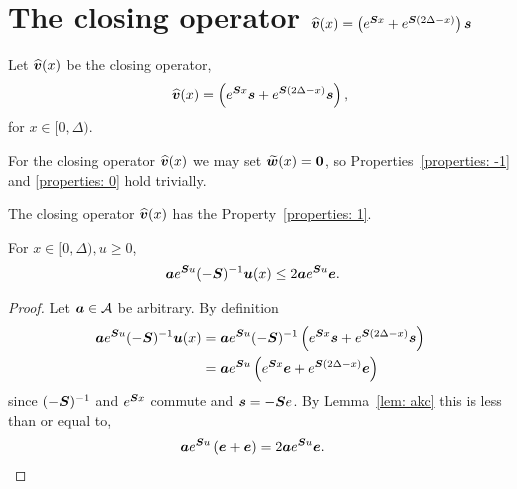 
\section{The closing operator \(\widehat{\boldsymbol v}(x) =  \left(e^{\boldsymbol{S} x}  + e^{\boldsymbol{S} (2\Delta-x)}  \right)\boldsymbol s\)}

Let \(\widehat{\boldsymbol v}(x)\) be the closing operator, 
\[  \widehat{\boldsymbol v}(x) =   \left(e^{\boldsymbol{S} x}\boldsymbol s  + e^{\boldsymbol{S} (2\Delta-x)}\boldsymbol s\right),\]
for \(x\in[0,\Delta)\).

For the closing operator \(\widehat{\boldsymbol v}(x)\) we may set \(\widetilde{\boldsymbol w}(x) = \boldsymbol 0\), so Properties~\ref{properties: -1} and \ref{properties: 0} hold trivially.

\begin{lem}\label{lem: akxnj}
	The closing operator \(\widehat{\boldsymbol v}(x)\) has the Property~\ref{properties: 1}.

	For \(x\in[0,\Delta),u\geq 0\),  
        \begin{align*}
        		\boldsymbol a   e^{\boldsymbol Su}(-\boldsymbol S)^{-1} {\boldsymbol u}(x) &\leq 2 \boldsymbol a e^{\boldsymbol Su} \boldsymbol e.
	\end{align*}
\end{lem}
\begin{proof}
Let \(\boldsymbol a   \in \mathcal A\) be arbitrary. By definition 
	\begin{align*}
        		\boldsymbol a  e^{\boldsymbol Su}(-\boldsymbol S)^{-1} {\boldsymbol u}(x) & = \boldsymbol a  e^{\boldsymbol Su}(-\boldsymbol S)^{-1}  \left(e^{\boldsymbol{S}x}\boldsymbol s + e^{\boldsymbol{S}(2\Delta-x)}\boldsymbol s\right)
				\\& = \boldsymbol a  e^{\boldsymbol Su}  \left(e^{\boldsymbol{S}x}\boldsymbol e + e^{\boldsymbol{S}(2\Delta-x)}\boldsymbol e\right)
	\end{align*}
	since \((-\boldsymbol S)^{-1}\) and \(e^{\boldsymbol Sx}\) commute and \(\boldsymbol s = -\boldsymbol S e\). 
	By Lemma~\ref{lem: akc} this is less than or equal to, 
	\begin{align}
        		& \boldsymbol a   e^{\boldsymbol Su} \left(\boldsymbol e + \boldsymbol e\right) = 2 \boldsymbol a   e^{\boldsymbol Su} \boldsymbol e. \label{eqn:mzm}
	\end{align}
\end{proof}

